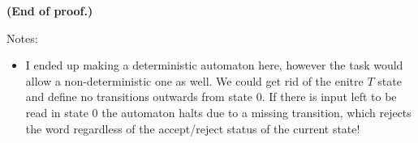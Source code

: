 \textbf{(End of proof.)}

Notes:

\begin{itemize}
    \item I ended up making a deterministic automaton here, however the task would allow a non-deterministic one as well. We could get rid of the enitre $T$ state and define no transitions outwards from state $0$. If there is input left to be read in state $0$ the automaton halts due to a missing transition, which rejects the word regardless of the accept/reject status of the current state!
\end{itemize}